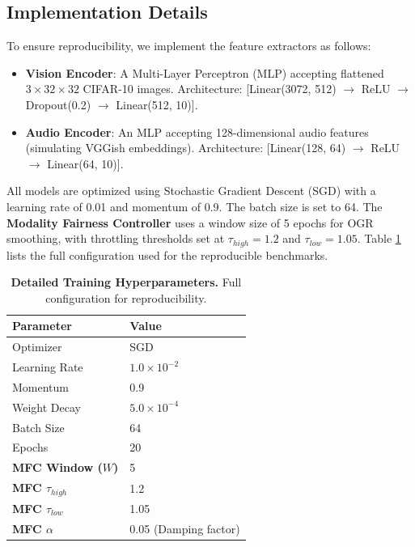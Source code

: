 \documentclass[10pt, twocolumn, letterpaper]{article}
\begin{document}
\subsection{Implementation Details}
To ensure reproducibility, we implement the feature extractors as follows:
\begin{itemize}
    \item \textbf{Vision Encoder}: A Multi-Layer Perceptron (MLP) accepting flattened $3 \times 32 \times 32$ CIFAR-10 images. Architecture: [Linear(3072, 512) $\rightarrow$ ReLU $\rightarrow$ Dropout(0.2) $\rightarrow$ Linear(512, 10)].
    \item \textbf{Audio Encoder}: An MLP accepting 128-dimensional audio features (simulating VGGish embeddings). Architecture: [Linear(128, 64) $\rightarrow$ ReLU $\rightarrow$ Linear(64, 10)].
\end{itemize}
All models are optimized using Stochastic Gradient Descent (SGD) with a learning rate of 0.01 and momentum of 0.9. The batch size is set to 64. The \textbf{Modality Fairness Controller} uses a window size of 5 epochs for OGR smoothing, with throttling thresholds set at $\tau_{high}=1.2$ and $\tau_{low}=1.05$. Table \ref{tab:hyperparams_main} lists the full configuration used for the reproducible benchmarks.

\begin{table}[h]
\centering
\begin{tabular}{@{}ll@{}}
\toprule
\textbf{Parameter} & \textbf{Value} \\ \midrule
Optimizer & SGD \\
Learning Rate & $1.0 \times 10^{-2}$ \\
Momentum & 0.9 \\
Weight Decay & $5.0 \times 10^{-4}$ \\ 
Batch Size & 64 \\
Epochs & 20 \\
\textbf{MFC Window ($W$)} & 5 \\
\textbf{MFC $\tau_{high}$} & 1.2 \\
\textbf{MFC $\tau_{low}$} & 1.05 \\
\textbf{MFC $\alpha$} & 0.05 (Damping factor) \\ \bottomrule
\end{tabular}
\caption{\textbf{Detailed Training Hyperparameters.} Full configuration for reproducibility.}
\label{tab:hyperparams_main}
\end{table}
\end{document}
